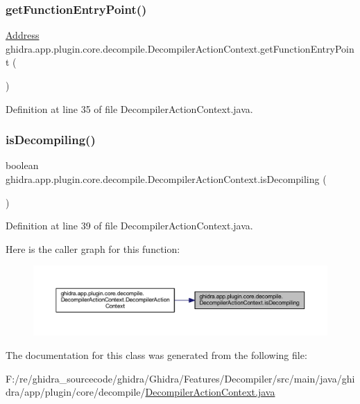 \subsubsection{\texorpdfstring{getFunctionEntryPoint()}{getFunctionEntryPoint()}}
{\footnotesize\ttfamily \mbox{\hyperlink{class_address}{Address}} ghidra.\+app.\+plugin.\+core.\+decompile.\+Decompiler\+Action\+Context.\+get\+Function\+Entry\+Point (\begin{DoxyParamCaption}{ }\end{DoxyParamCaption})\hspace{0.3cm}{\ttfamily [inline]}}



Definition at line 35 of file Decompiler\+Action\+Context.\+java.

\mbox{\label{classghidra_1_1app_1_1plugin_1_1core_1_1decompile_1_1_decompiler_action_context_ae27869d983ee6d09111ac16397bcd691}} 
\subsubsection{\texorpdfstring{isDecompiling()}{isDecompiling()}}
{\footnotesize\ttfamily boolean ghidra.\+app.\+plugin.\+core.\+decompile.\+Decompiler\+Action\+Context.\+is\+Decompiling (\begin{DoxyParamCaption}{ }\end{DoxyParamCaption})\hspace{0.3cm}{\ttfamily [inline]}}



Definition at line 39 of file Decompiler\+Action\+Context.\+java.

Here is the caller graph for this function\+:
\nopagebreak
\begin{figure}[H]
\begin{center}
\leavevmode
\includegraphics[width=350pt]{classghidra_1_1app_1_1plugin_1_1core_1_1decompile_1_1_decompiler_action_context_ae27869d983ee6d09111ac16397bcd691_icgraph}
\end{center}
\end{figure}


The documentation for this class was generated from the following file\+:\begin{DoxyCompactItemize}
\item 
F\+:/re/ghidra\+\_\+sourcecode/ghidra/\+Ghidra/\+Features/\+Decompiler/src/main/java/ghidra/app/plugin/core/decompile/\mbox{\hyperlink{_decompiler_action_context_8java}{Decompiler\+Action\+Context.\+java}}\end{DoxyCompactItemize}
